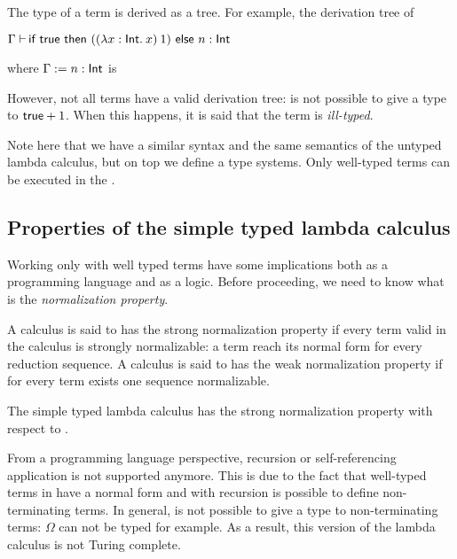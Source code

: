 The type of a term is derived as a tree. For example, the derivation tree of 
\begin{center}
$\ctyping{\ifterm{\trueTerm}{(\app{(\abs{x}{\tInt}{x})}{1})}{n}}{\tInt}$
\end{center}
where $\Context\termDef\typing{n}{\tInt}$ is
\begin{mathpar}
\end{mathpar}
However, not all terms have a valid derivation tree: is not possible to give a type to $\trueTerm + 1$. 
When this happens, it is said that the term is \emph{ill-typed}.

Note here that we have a similar syntax and the same semantics of the untyped lambda calculus, but on top 
we define a type systems. Only well-typed terms can be executed in the \tlambdaCalc{}.

\subsection{Properties of the simple typed lambda calculus}

Working only with well typed terms have some implications both
as a programming language and as a logic. Before proceeding, we need to know what is the 
\emph{normalization property}.
\begin{Definition}[Normalization]
A calculus is said to has the strong normalization property if every term valid in the calculus is strongly 
normalizable: a term reach its normal form for every reduction sequence.
A calculus is said to has the weak normalization property if for every term exists one sequence normalizable.
\end{Definition}
\noindent The simple typed lambda calculus has the strong normalization property with 
respect to \betaRed{}\cite{tait:typedLambdaStrong1967}.

From a programming language perspective, recursion or self-referencing
application is not supported anymore. This is due to the fact that well-typed terms in \tlambdaCalc{} 
have a normal form and with recursion is possible to define non-terminating terms. In general, 
is not possible to give a type to non-terminating terms: $\Omega$ can not be typed for example. As a 
result, this version of the lambda calculus is not Turing complete.

